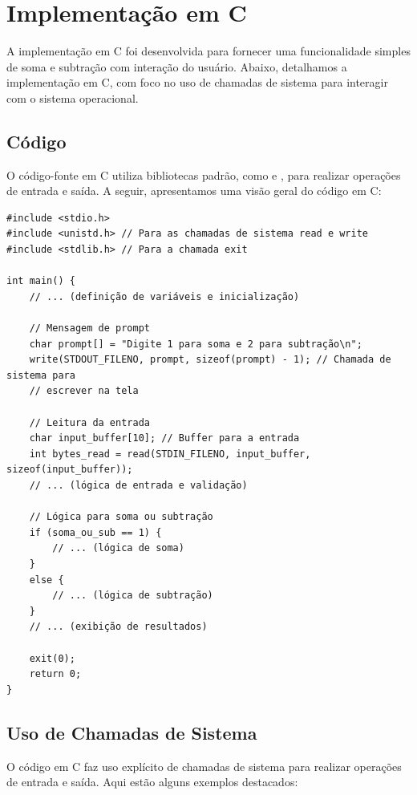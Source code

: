 \documentclass[
	12pt,				%
	openright,			%
	oneside,			%
	a4paper,			%
	chapter=TITLE,		%
	english,			%
	french,				%
	spanish,			%
	brazil				%
	]{abntex2}
\theoremstyle{definition}
\begin{document}
\section{Implementação em C}

A implementação em C foi desenvolvida para fornecer uma funcionalidade simples de soma e subtração com 
interação do usuário. Abaixo, detalhamos a implementação em C, com foco no uso de chamadas de sistema 
para interagir com o sistema operacional.

\subsection{Código}

O código-fonte em C utiliza bibliotecas padrão, como  e , 
para realizar operações de entrada e saída. A seguir, apresentamos uma visão geral do código em C:

\begin{verbatim}
#include <stdio.h>
#include <unistd.h> // Para as chamadas de sistema read e write
#include <stdlib.h> // Para a chamada exit

int main() {
    // ... (definição de variáveis e inicialização)

    // Mensagem de prompt
    char prompt[] = "Digite 1 para soma e 2 para subtração\n";
    write(STDOUT_FILENO, prompt, sizeof(prompt) - 1); // Chamada de sistema para 
	// escrever na tela

    // Leitura da entrada
    char input_buffer[10]; // Buffer para a entrada
    int bytes_read = read(STDIN_FILENO, input_buffer, sizeof(input_buffer));
    // ... (lógica de entrada e validação)

    // Lógica para soma ou subtração
    if (soma_ou_sub == 1) {
        // ... (lógica de soma)
    } 
    else {
        // ... (lógica de subtração)
    }
    // ... (exibição de resultados)

    exit(0);
    return 0;
}
\end{verbatim}

\subsection{Uso de Chamadas de Sistema}

O código em C faz uso explícito de chamadas de sistema para realizar operações de entrada e saída. 
Aqui estão alguns exemplos destacados:
\end{document}
